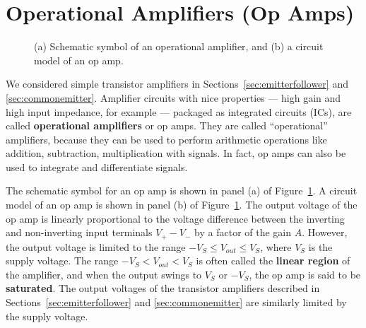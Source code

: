 \documentclass[11pt]{article}
\begin{document}
\newpage

\section{Operational Amplifiers (Op Amps)}
\label{sec:opamps}

\begin{figure}[ht]
  \begin{center}
    \caption{(a) Schematic symbol of an operational amplifier, and
      (b) a circuit model of an op amp.}
    \label{fig:opampmodel}
  \end{center}
\end{figure}

We considered simple transistor amplifiers in
Sections~\ref{sec:emitterfollower} and \ref{sec:commonemitter}.
Amplifier circuits with nice properties --- high gain and 
high input impedance, for example --- packaged as integrated circuits
(ICs), are called \textbf{operational amplifiers} or op amps. They are
called ``operational'' amplifiers, because they can be used to perform
arithmetic operations like addition, subtraction, multiplication with
signals. In fact, op amps can also be used to integrate and
differentiate signals.

The schematic symbol for an op amp is shown in panel (a)
of Figure~\ref{fig:opampmodel}. A circuit model of an op amp is shown
in panel (b) of Figure~\ref{fig:opampmodel}. The output voltage of the
op amp is linearly proportional to the voltage difference between the
inverting and non-inverting input terminals $V_+ - V_-$ by a factor of
the gain $A$. However, the output voltage is limited to the range
$-V_S \leq V_{out} \leq V_S$, where $V_S$ is the supply voltage. The
range $-V_S < V_{out} < V_S$ is often called the \textbf{linear region}
of the amplifier, and when the output swings to $V_S$ or $-V_S$, the
op amp is said to be \textbf{saturated}. The output voltages of the
transistor amplifiers described in Sections~\ref{sec:emitterfollower} and
\ref{sec:commonemitter} are similarly limited by the supply voltage.
\end{document}
